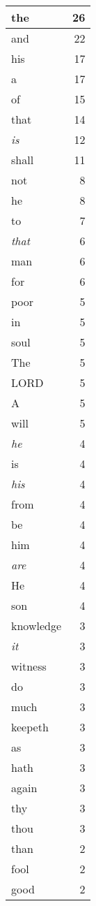\begin{center}
\begin{longtable}{l|r}
the & 26\\ \hline 
and & 22\\ \hline 
his & 17\\ \hline 
a & 17\\ \hline 
of & 15\\ \hline 
that & 14\\ \hline 
\emph{is} & 12\\ \hline 
shall & 11\\ \hline 
not & 8\\ \hline 
he & 8\\ \hline 
to & 7\\ \hline 
\emph{that} & 6\\ \hline 
man & 6\\ \hline 
for & 6\\ \hline 
poor & 5\\ \hline 
in & 5\\ \hline 
soul & 5\\ \hline 
The & 5\\ \hline 
LORD & 5\\ \hline 
A & 5\\ \hline 
will & 5\\ \hline 
\emph{he} & 4\\ \hline 
is & 4\\ \hline 
\emph{his} & 4\\ \hline 
from & 4\\ \hline 
be & 4\\ \hline 
him & 4\\ \hline 
\emph{are} & 4\\ \hline 
He & 4\\ \hline 
son & 4\\ \hline 
knowledge & 3\\ \hline 
\emph{it} & 3\\ \hline 
witness & 3\\ \hline 
do & 3\\ \hline 
much & 3\\ \hline 
keepeth & 3\\ \hline 
as & 3\\ \hline 
hath & 3\\ \hline 
again & 3\\ \hline 
thy & 3\\ \hline 
thou & 3\\ \hline 
than & 2\\ \hline 
fool & 2\\ \hline 
good & 2\\ \hline 

\end{longtable}
\end{center}
